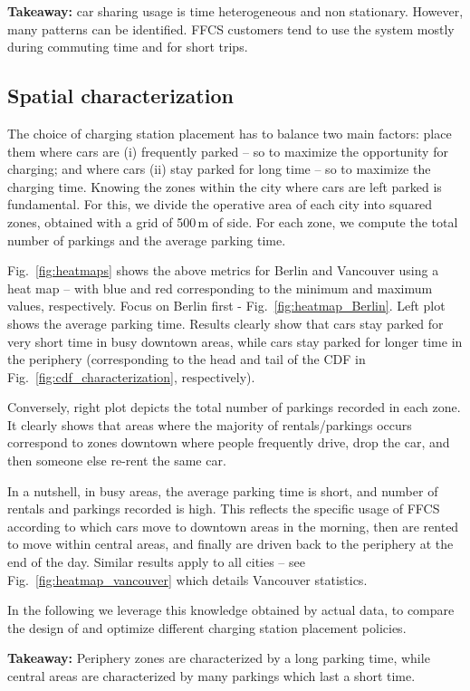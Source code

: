 \textbf{Takeaway:} car sharing usage is time heterogeneous and non stationary. However, many patterns can be identified. FFCS customers tend to use the system mostly during commuting time and for short trips.

\subsection{Spatial characterization}
\label{sec:dataspace}
The choice of charging station placement has to balance two main factors: place them where cars are (i) frequently parked -- so to maximize the opportunity for charging; and where cars (ii) stay parked for long time -- so to maximize the charging time. Knowing the zones within the city where cars are left parked is fundamental. For this, we divide the operative area of each city into squared zones, obtained with a grid of 500\,m of side. For each zone, we compute the total number of parkings and the average parking time.

Fig.~\ref{fig:heatmaps} shows the above metrics for Berlin and Vancouver using a heat map -- with blue and red corresponding to the minimum and maximum values, respectively. Focus on Berlin first - Fig.~\ref{fig:heatmap_Berlin}. Left plot shows the average parking time. Results clearly show that cars stay parked for very short time in busy downtown areas, while cars stay parked for longer time in the periphery (corresponding to the head and tail of the CDF in Fig.~\ref{fig:cdf_characterization}, respectively).

Conversely, right plot depicts the total number of parkings recorded in each zone. It clearly shows that areas where the majority of rentals/parkings occurs correspond to zones downtown where people frequently drive, drop the car, and then someone else re-rent the same car. 

In a nutshell, in busy areas, the average parking time is short, and number of rentals and parkings recorded is high. This reflects the specific usage of FFCS according to which cars move to downtown areas in the morning, then are rented to move within central areas, and finally are driven back to the periphery at the end of the day.
Similar results apply to all cities -- see Fig.~\ref{fig:heatmap_vancouver} which details Vancouver statistics.

In the following we leverage this knowledge obtained by actual data, to compare the design of and optimize different charging station placement policies.


\textbf{Takeaway:} Periphery zones are characterized by a long parking time, while central areas are characterized by many parkings which last a short time.


